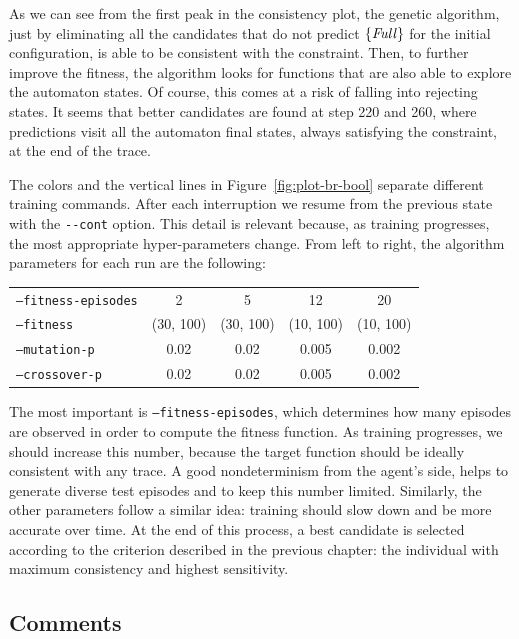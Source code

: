 As we can see from the first peak in the consistency plot, the genetic
algorithm, just by eliminating all the candidates that do not predict
$\{\text{\textit{Full}}\}$ for the initial configuration, is able to be consistent
with the constraint. Then, to further improve the fitness, the algorithm
looks for functions that are also able to explore the automaton states. Of
course, this comes at a risk of falling into rejecting states.
It seems that better candidates are found at step 220 and 260, where
predictions visit all the automaton final states, always satisfying the
constraint, at the end of the trace.

The colors and the vertical lines in Figure~\ref{fig:plot-br-bool} separate
different training commands. After each interruption we resume from the
previous state with the \verb|--cont| option. This detail is relevant because,
as training progresses, the most appropriate hyper-parameters change. From
left to right, the algorithm parameters for each run are the following:
\begin{center}
\begin{tabular}{l*4c}
	\texttt{--fitness-episodes} & 2 & 5 & 12 & 20 \\
	\texttt{--fitness} & (30, 100) & (30, 100) & (10, 100) & (10, 100) \\
	\texttt{--mutation-p} & 0.02 & 0.02 & 0.005 & 0.002 \\
	\texttt{--crossover-p} & 0.02 & 0.02 & 0.005 & 0.002
\end{tabular}
\end{center}
The most important is \texttt{--fitness-episodes}, which determines how many
episodes are observed in order to compute the fitness function. As training
progresses, we should increase this number, because the target function should
be ideally consistent with any trace. A good nondeterminism from the agent's
side, helps to generate diverse test episodes and to keep this number limited.
Similarly, the other parameters follow a similar idea: training should slow
down and be more accurate over time.  At the end of this process, a best
candidate is selected according to the criterion described in the previous
chapter: the individual with maximum consistency and highest sensitivity.


\subsection{Comments}

